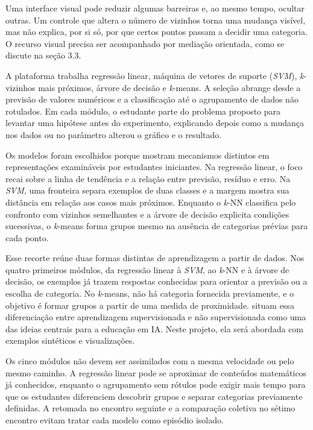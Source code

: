Uma interface visual pode reduzir algumas barreiras e, ao mesmo tempo, ocultar outras. Um controle que altera o número de vizinhos torna uma mudança visível, mas não explica, por si só, por que certos pontos passam a decidir uma categoria. O recurso visual precisa ser acompanhado por mediação orientada, como se discute na seção 3.3.

A plataforma trabalha regressão linear, máquina de vetores de suporte (\textit{SVM}), \textit{k}-vizinhos mais próximos, árvore de decisão e \textit{k}-means. A seleção abrange desde a previsão de valores numéricos e a classificação até o agrupamento de dados não rotulados. Em cada módulo, o estudante parte do problema proposto para levantar uma hipótese antes do experimento, explicando depois como a mudança nos dados ou no parâmetro alterou o gráfico e o resultado.

Os modelos foram escolhidos porque mostram mecanismos distintos em representações examináveis por estudantes iniciantes. Na regressão linear, o foco recai sobre a linha de tendência e a relação entre previsão, resíduo e erro. Na \textit{SVM}, uma fronteira separa exemplos de duas classes e a margem mostra sua distância em relação aos casos mais próximos. Enquanto o \textit{k}-NN classifica pelo confronto com vizinhos semelhantes e a árvore de decisão explicita condições sucessivas, o \textit{k}-means forma grupos mesmo na ausência de categorias prévias para cada ponto.

Esse recorte reúne duas formas distintas de aprendizagem a partir de dados. Nos quatro primeiros módulos, da regressão linear à \textit{SVM}, ao \textit{k}-NN e à árvore de decisão, os exemplos já trazem respostas conhecidas para orientar a previsão ou a escolha de categoria. No \textit{k}-means, não há categoria fornecida previamente, e o objetivo é formar grupos a partir de uma medida de proximidade.  situam essa diferenciação entre aprendizagem supervisionada e não supervisionada como uma das ideias centrais para a educação em IA. Neste projeto, ela será abordada com exemplos sintéticos e visualizações.

Os cinco módulos não devem ser assimilados com a mesma velocidade ou pelo mesmo caminho. A regressão linear pode se aproximar de conteúdos matemáticos já conhecidos, enquanto o agrupamento sem rótulos pode exigir mais tempo para que os estudantes diferenciem descobrir grupos e separar categorias previamente definidas. A retomada no encontro seguinte e a comparação coletiva no sétimo encontro evitam tratar cada modelo como episódio isolado.

